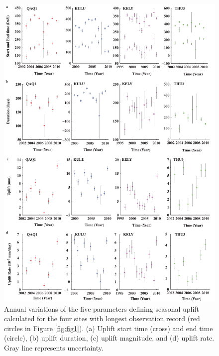 \clearpage
\begin{figure}
 \centering
 \includegraphics{figs_chpt3/2012GC004432-p03.pdf} 
 \caption[Annual variations of the five parameters defining seasonal uplift calculated for the four sites with longest observation record (red circles in Figure \ref{fig:fig1}).]{Annual variations of the five parameters defining seasonal uplift calculated for the four sites with longest observation record (red circles in Figure \ref{fig:fig1}). (a) Uplift start time (cross) and end time (circle), (b) uplift duration, (c) uplift magnitude, and (d) uplift rate. Gray line represents uncertainty.}
 \label{fig:fig3}
\end{figure}

